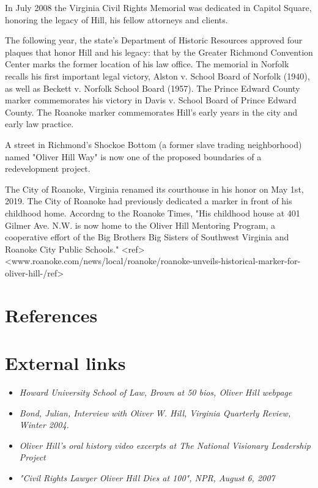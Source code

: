 In July 2008 the Virginia Civil Rights Memorial was dedicated in Capitol
Square, honoring the legacy of Hill, his fellow attorneys and clients.

The following year, the state's Department of Historic Resources
approved four plaques that honor Hill and his legacy: that by the
Greater Richmond Convention Center marks the former location of his law
office. The memorial in Norfolk recalls his first important legal
victory, Alston v. School Board of Norfolk (1940), as well as Beckett v.
Norfolk School Board (1957). The Prince Edward County marker
commemorates his victory in Davis v. School Board of Prince Edward
County. The Roanoke marker commemorates Hill's early years in the city
and early law practice.

A street in Richmond's Shockoe Bottom (a former slave trading
neighborhood) named "Oliver Hill Way" is now one of the proposed
boundaries of a redevelopment project.

The City of Roanoke, Virginia renamed its courthouse in his honor on May
1st, 2019. The City of Roanoke had previously dedicated a marker in
front of his childhood home. Accordng to the Roanoke Times, "His
childhood house at 401 Gilmer Ave. N.W. is now home to the Oliver Hill
Mentoring Program, a cooperative effort of the Big Brothers Big Sisters
of Southwest Virginia and Roanoke City Public Schools."
\textless{}ref\textgreater{}\textless{}www.roanoke.com/news/local/roanoke/roanoke-unveils-historical-marker-for-oliver-hill-/ref\textgreater{}

\section{References}\label{references}

\section{External links}\label{external-links}

\begin{itemize}
\item
  \emph{Howard University School of Law, Brown at 50 bios, Oliver Hill
  webpage}
\item
  \emph{Bond, Julian, Interview with Oliver W. Hill, Virginia Quarterly
  Review, Winter 2004.}
\item
  \emph{Oliver Hill's oral history video excerpts at The National
  Visionary Leadership Project}
\item
  \emph{"Civil Rights Lawyer Oliver Hill Dies at 100", NPR, August 6,
  2007}
\end{itemize}

